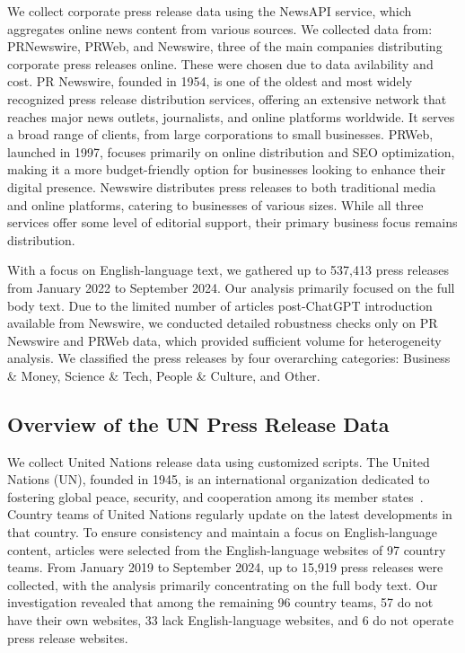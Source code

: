 We collect corporate press release data using the NewsAPI service, which aggregates online news content from various sources. We collected data from: PRNewswire, PRWeb, and Newswire, three of the main companies distributing corporate press releases online. These were chosen due to data avilability and cost. PR Newswire, founded in 1954, is one of the oldest and most widely recognized press release distribution services, offering an extensive network that reaches major news outlets, journalists, and online platforms worldwide. It serves a broad range of clients, from large corporations to small businesses. PRWeb, launched in 1997, focuses primarily on online distribution and SEO optimization, making it a more budget-friendly option for businesses looking to enhance their digital presence. Newswire distributes press releases to both traditional media and online platforms, catering to businesses of various sizes. While all three services offer some level of editorial support, their primary business focus remains distribution.

With a focus on English-language text, we gathered up to 537,413 press releases from January 2022 to September 2024.  Our analysis primarily focused on the full body text. Due to the limited number of articles post-ChatGPT introduction available from Newswire, we conducted detailed robustness checks only on PR Newswire and PRWeb data, which provided sufficient volume for heterogeneity analysis.  We  classified the press releases by four overarching categories: Business \& Money, Science \& Tech, People \& Culture, and Other. 








\subsection*{Overview of the UN Press Release Data}
\label{main:subsec:press-release-data}

We collect United Nations release data using customized scripts. The United Nations (UN), founded in 1945, is an international organization dedicated to fostering global peace, security, and cooperation among its member states~\cite{shin2024adoption}. 
Country teams of United Nations regularly update on the latest developments in that country.
To ensure consistency and maintain a focus on English-language content, articles were selected from the English-language websites of 97 country teams. From January 2019 to September 2024, up to 15,919 press releases were collected, with the analysis primarily concentrating on the full body text. Our investigation revealed that among the remaining 96 country teams, 57 do not have their own websites, 33 lack English-language websites, and 6 do not operate press release websites.




















